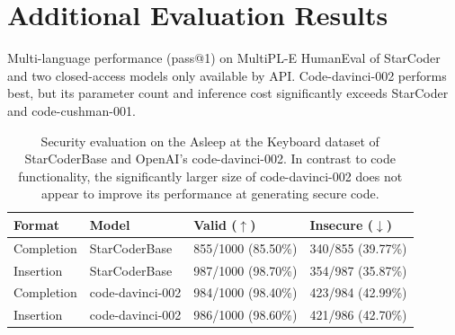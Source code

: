 \documentclass[10pt]{article} %
\begin{document}
\clearpage
\section{Additional Evaluation Results}
\begin{table}[h]
\centering

\caption{Multi-language performance (pass@1) on MultiPL-E HumanEval of StarCoder and two closed-access models only available by API. Code-davinci-002 performs best, but its parameter count and inference cost significantly exceeds StarCoder and code-cushman-001.}
\label{tab:multiple_api}
\end{table}

\begin{table}[h]
\centering
\begin{tabular}{llll}
\toprule
 \textbf{Format}     & \textbf{Model}             & \textbf{Valid ($\uparrow$)}             & \textbf{Insecure ($\downarrow$)}         \\
\midrule
 Completion & StarCoderBase         & 855/1000 (85.50\%) & 340/855 (39.77\%) \\
 Insertion  & StarCoderBase         & 987/1000 (98.70\%) & 354/987 (35.87\%) \\
 Completion & code-davinci-002  & 984/1000 (98.40\%) & 423/984 (42.99\%) \\
 Insertion  & code-davinci-002  & 986/1000 (98.60\%) & 421/986 (42.70\%) \\
\bottomrule
\end{tabular}
\caption{Security evaluation on the Asleep at the Keyboard dataset of StarCoderBase and OpenAI's code-davinci-002. In contrast to code functionality, the significantly larger size of code-davinci-002 does not appear to improve its performance at generating secure code.}
\label{tab:asleep_davinci}
\end{table}
\end{document}
